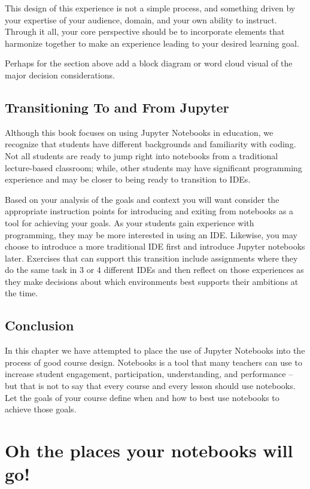\documentclass[]{book}
\begin{document}
This design of this experience is not a simple process, and something
driven by your expertise of your audience, domain, and your own ability
to instruct. Through it all, your core perspective should be to
incorporate elements that harmonize together to make an experience
leading to your desired learning goal.

Perhaps for the section above add a block diagram or word cloud visual
of the major decision considerations.

\section{Transitioning To and From
Jupyter}\label{transitioning-to-and-from-jupyter}

Although this book focuses on using Jupyter Notebooks in education, we
recognize that students have different backgrounds and familiarity with
coding. Not all students are ready to jump right into notebooks from a
traditional lecture-based classroom; while, other students may have
significant programming experience and may be closer to being ready to
transition to IDEs.

Based on your analysis of the goals and context you will want consider
the appropriate instruction points for introducing and exiting from
notebooks as a tool for achieving your goals. As your students gain
experience with programming, they may be more interested in using an
IDE. Likewise, you may choose to introduce a more traditional IDE first
and introduce Jupyter notebooks later. Exercises that can support this
transition include assignments where they do the same task in 3 or 4
different IDEs and then reflect on those experiences as they make
decisions about which environments best supports their ambitions at the
time.

\section{Conclusion}\label{conclusion}

In this chapter we have attempted to place the use of Jupyter Notebooks
into the process of good course design. Notebooks is a tool that many
teachers can use to increase student engagement, participation,
understanding, and performance -- but that is not to say that every
course and every lesson should use notebooks. Let the goals of your
course define when and how to best use notebooks to achieve those goals.

\chapter{Oh the places your notebooks will
go!}\label{oh-the-places-your-notebooks-will-go}
\end{document}
